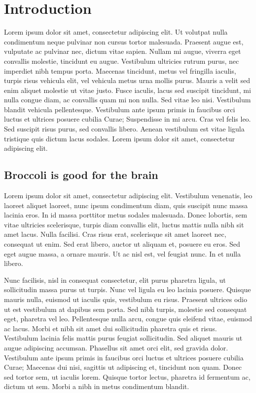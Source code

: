 
\section{Introduction}

Lorem ipsum dolor sit amet, consectetur adipiscing elit. Ut volutpat nulla
condimentum neque pulvinar non cursus tortor malesuada. Praesent augue est,
vulputate ac pulvinar nec, dictum vitae sapien. Nullam mi augue, viverra eget
convallis molestie, tincidunt eu augue. Vestibulum ultricies rutrum purus, nec
imperdiet nibh tempus porta. Maecenas tincidunt, metus vel fringilla iaculis,
turpis risus vehicula elit, vel vehicula metus urna mollis purus. Mauris a
velit sed enim aliquet molestie ut vitae justo. Fusce iaculis, lacus sed
suscipit tincidunt, mi nulla congue diam, ac convallis quam mi non nulla. Sed
vitae leo nisi. Vestibulum blandit vehicula pellentesque. Vestibulum ante ipsum
primis in faucibus orci luctus et ultrices posuere cubilia Curae; Suspendisse
in mi arcu. Cras vel felis leo. Sed suscipit risus purus, sed convallis libero.
Aenean vestibulum est vitae ligula tristique quis dictum lacus sodales. Lorem
ipsum dolor sit amet, consectetur adipiscing elit.

\subsection{Broccoli is good for the brain}

Lorem ipsum dolor sit amet, consectetur adipiscing elit. Vestibulum venenatis,
leo laoreet aliquet laoreet, nunc ipsum condimentum diam, quis suscipit nunc
massa lacinia eros. In id massa porttitor metus sodales malesuada. Donec
lobortis, sem vitae ultricies scelerisque, turpis diam convallis elit, luctus
mattis nulla nibh sit amet lacus. Nulla facilisi. Cras risus erat, scelerisque
sit amet laoreet nec, consequat ut enim. Sed erat libero, auctor ut aliquam et,
posuere eu eros. Sed eget augue massa, a ornare mauris. Ut ac nisl est, vel
feugiat nunc. In et nulla libero.

Nunc facilisis, nisl in consequat consectetur, elit purus pharetra ligula, ut
sollicitudin massa purus ut turpis. Nunc vel ligula eu leo lacinia posuere.
Quisque mauris nulla, euismod ut iaculis quis, vestibulum eu risus. Praesent
ultrices odio ut est vestibulum at dapibus sem porta. Sed nibh turpis, molestie
sed consequat eget, pharetra vel leo. Pellentesque nulla arcu, congue quis
eleifend vitae, euismod ac lacus. Morbi et nibh sit amet dui sollicitudin
pharetra quis et risus. Vestibulum lacinia felis mattis purus feugiat
sollicitudin. Sed aliquet mauris ut augue adipiscing accumsan. Phasellus sit
amet orci elit, sed gravida dolor. Vestibulum ante ipsum primis in faucibus
orci luctus et ultrices posuere cubilia Curae; Maecenas dui nisi, sagittis ut
adipiscing et, tincidunt non quam. Donec sed tortor sem, ut iaculis lorem.
Quisque tortor lectus, pharetra id fermentum ac, dictum ut sem. Morbi a nibh in
metus condimentum blandit.

